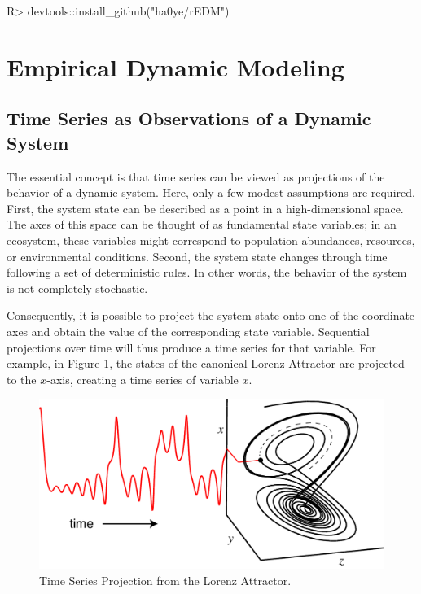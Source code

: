 \documentclass[article]{jss}
\begin{document}
\begin{Schunk}
\begin{Sinput}
R> devtools::install_github("ha0ye/rEDM")
\end{Sinput}
\end{Schunk}

\section{Empirical Dynamic Modeling}\label{sec:empirical-dynamic-modeling}

\subsection{Time Series as Observations of a Dynamic System}\label{sec:time-series}

The essential concept is that time series can be viewed as projections of the behavior of a dynamic system. Here, only a few modest assumptions are required. First, the system state can be described as a point in a high-dimensional space. The axes of this space can be thought of as fundamental state variables; in an ecosystem, these variables might correspond to population abundances, resources, or environmental conditions. Second, the system state changes through time following a set of deterministic rules. In other words, the behavior of the system is not completely stochastic.

Consequently, it is possible to project the system state onto one of the coordinate axes and obtain the value of the corresponding state variable. Sequential projections over time will thus produce a time series for that variable. For example, in Figure \ref{fig:time-series-projection}, the states of the canonical Lorenz Attractor \citep{Lorenz_1963} are projected to the $x$-axis, creating a time series of variable $x$.

\begin{figure}[t!]
\centering
\includegraphics{figure_1}
\caption{\label{fig:time-series-projection} Time Series Projection from the Lorenz Attractor.}
\end{figure}
\end{document}
